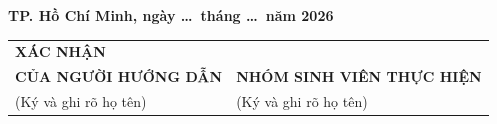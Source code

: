 \documentclass[12pt,a4paper]{article}
\begin{document}
\hfill\textbf{TP. Hồ Chí Minh, ngày \ldots\ tháng \ldots\ năm 2026}
\begin{center}
\begin{tabular}[t]{>{\centering\arraybackslash}p{}
                  >{\centering\arraybackslash}p{}}
\textbf{XÁC NHẬN}\\
\textbf{CỦA NGƯỜI HƯỚNG DẪN}
&
\textbf{NHÓM SINH VIÊN THỰC HIỆN}
\\
(Ký và ghi rõ họ tên)
&
(Ký và ghi rõ họ tên)
\\[2.5cm]
\end{tabular}
\end{center}
\end{document}
